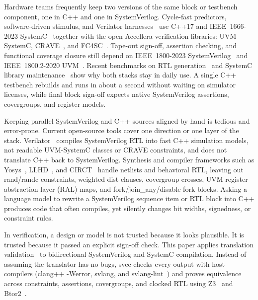 \documentclass[conference]{IEEEtran}
\newcommand{\code}[1]{{\fontshape{n}\ttfamily #1}}
\begin{document}
Hardware teams frequently keep two versions of the same block or testbench component, one in C++ and one in SystemVerilog. Cycle-fast predictors, software-driven stimulus, and Verilator harnesses~\cite{snyder2020verilator} use C++17 and IEEE~1666-2023 SystemC~\cite{ieee1666_2023,ghenassia2005tlm} together with the open Accellera verification libraries: UVM-SystemC, CRAVE~\cite{haedicke2012crave}, and FC4SC~\cite{accellera2026systemc}. Tape-out sign-off, assertion checking, and functional coverage closure still depend on IEEE~1800-2023 SystemVerilog~\cite{ieee1800_2023} and IEEE~1800.2-2020 UVM~\cite{ieee1800_2_2020}. Recent benchmarks on RTL generation~\cite{liu2023verilogeval,thakur2024verigen} and SystemC library maintenance~\cite{kubavat2026scbench} show why both stacks stay in daily use. A single C++ testbench rebuilds and runs in about a second without waiting on simulator licenses, while final block sign-off expects native SystemVerilog assertions, covergroups, and register models.

Keeping parallel SystemVerilog and C++ sources aligned by hand is tedious and error-prone. Current open-source tools cover one direction or one layer of the stack. Verilator~\cite{snyder2020verilator} compiles SystemVerilog RTL into fast C++ simulation models, not readable UVM-SystemC classes or CRAVE constraints, and does not translate C++ back to SystemVerilog. Synthesis and compiler frameworks such as Yosys~\cite{wolf2013yosys}, LLHD~\cite{schuiki2020llhd}, and CIRCT~\cite{lattner2021mlir,circt2024} handle netlists and behavioral RTL, leaving out \code{rand}/\code{randc} constraints, weighted \code{dist} clauses, covergroup crosses, UVM register abstraction layer (RAL) maps, and \code{fork}/\code{join\_any}/\code{disable fork} blocks. Asking a language model to rewrite a SystemVerilog sequence item or RTL block into C++ produces code that often compiles, yet silently changes bit widths, signedness, or constraint rules.

In verification, a design or model is not trusted because it looks plausible. It is trusted because it passed an explicit sign-off check. This paper applies translation validation~\cite{pnueli1998tv,lopes2021alive2} to bidirectional SystemVerilog and SystemC compilation. Instead of assuming the translator has no bugs, \code{svcc} checks every output with host compilers (\code{clang++ -Werror}, \code{svlang}, and \code{svlang-lint}~\cite{kubavat2026svlang}) and proves equivalence across constraints, assertions, covergroups, and clocked RTL using Z3~\cite{demoura2008z3} and Btor2~\cite{niemetz2018btor2}.
\end{document}
